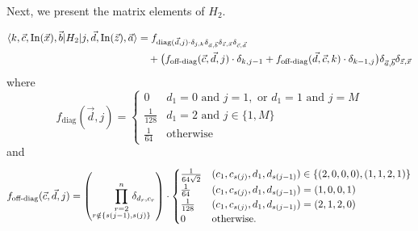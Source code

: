 \documentclass[../thesis-main/thesis-main]{subfiles}
\begin{document}
Next, we present the matrix elements of $H_2$.

\begin{mdframed}[frametitle=Matrix elements of $H_{2}$]
\begin{align}
\langle k,\vec{c},\operatorname{In}(\vec{x}),\vec{b}|H_{2}|j,\vec{d},\operatorname{In}(\vec{z}),\vec{a}\rangle & =f_{\mathrm{diag}(\vec{d},j)\cdot\delta_{j,k}\delta_{\vec{a},\vec{b}}\delta_{\vec{z},\vec{x}}\delta_{\vec{c},\vec{d}}}\label{eq:H2_formula_with_f}\\
 & \quad +\big(f_{\textrm{off-diag}}(\vec{c},\vec{d},j)\cdot\delta_{k,j-1}+f_{\textrm{off-diag}}(\vec{d},\vec{c},k)\cdot\delta_{k-1,j}\big)\delta_{\vec{a},\vec{b}}\delta_{\vec{z},\vec{x}}\nonumber 
\end{align}
where
\begin{equation}
f_{\mathrm{diag}}(\vec{d},j)=\begin{cases}
0 & d_{1}=0\text{ and }j=1,\text{ or }d_{1}=1\text{ and }j=M\\
\frac{1}{128} & d_{1}=2\text{ and }j\in\{1,M\}\\
\frac{1}{64} & \text{otherwise}
\end{cases}\label{eq:H2_diag_goodbasis-1}
\end{equation}
and 
\begin{equation}
f_{\textrm{off-diag}}(\vec{c},\vec{d},j)=\left(
\prod_{\substack{r=2\\r\notin\{s(j-1),s(j)\}}}^n \mkern-36mu\delta_{d_{r},c_{r}}\right)\cdot\begin{cases}
\frac{1}{64\sqrt{2}} & (c_{1},c_{s(j)},d_{1},d_{s(j-1)})\in\{(2,0,0,0),(1,1,2,1)\}\\
\frac{1}{64} & (c_{1},c_{s(j)},d_{1},d_{s(j-1)})=(1,0,0,1)\\
\frac{1}{128} & (c_{1},c_{s(j)},d_{1},d_{s(j-1)})=(2,1,2,0)\\
0 & \text{otherwise.}
\end{cases}\label{eq:H2_offdiag_goodbasis-1}
\end{equation}
\end{mdframed}
\end{document}
